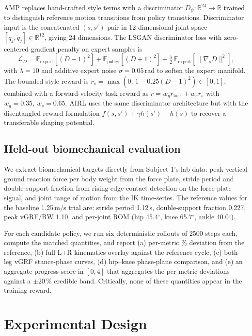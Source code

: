 \documentclass{article}
\begin{document}
AMP replaces hand-crafted style terms with a discriminator $D_\psi: \mathbb{R}^{24} \to \mathbb{R}$ trained to distinguish reference motion transitions from policy transitions. Discriminator input is the concatenated $(s, s')$ pair in 12-dimensional joint space $[q_j, \dot q_j] \in \mathbb{R}^{12}$, giving 24 dimensions. The LSGAN discriminator loss with zero-centered gradient penalty on expert samples is
\[
\mathcal{L}_D = \mathbb{E}_{\text{expert}}\!\left[(D-1)^2\right] + \mathbb{E}_{\text{policy}}\!\left[(D+1)^2\right] + \tfrac{\lambda}{2}\, \mathbb{E}_{\text{expert}}\!\left[\lVert \nabla_s D \rVert^2 \right],
\]
with $\lambda = 10$ and additive expert noise $\sigma = 0.05$\,rad to soften the expert manifold. The bounded style reward is $r_s = \max(0,\, 1 - 0.25(D-1)^2) \in [0, 1]$, combined with a forward-velocity task reward as $r = w_g r_{\text{task}} + w_s r_s$ with $w_g = 0.35$, $w_s = 0.65$. AIRL uses the same discriminator architecture but with the disentangled reward formulation $f(s,s') + \gamma h(s') - h(s)$ to recover a transferable shaping potential.

\subsection{Held-out biomechanical evaluation}
\label{sec:method-eval}

We extract biomechanical targets directly from Subject 1's lab data: peak vertical ground reaction force per body weight from the force plate, stride period and double-support fraction from rising-edge contact detection on the force-plate signal, and joint range of motion from the IK time-series. The reference values for the baseline 1.25\,m/s trial are: stride period 1.12\,s, double-support fraction 0.227, peak vGRF/BW 1.10, and per-joint ROM (hip 45.4$^\circ$, knee 65.7$^\circ$, ankle 40.0$^\circ$).

For each candidate policy, we run six deterministic rollouts of 2500 steps each, compute the matched quantities, and report (a) per-metric \% deviation from the reference, (b) full L+R kinematics overlay against the reference cycle, (c) both-leg vGRF stance-phase curves, (d) hip--knee phase-plane comparison, and (e) an aggregate progress score in $[0, 4]$ that aggregates the per-metric deviations against a $\pm 20$\,\% credible band. Critically, none of these quantities appear in the training reward.

\section{Experimental Design}
\end{document}
